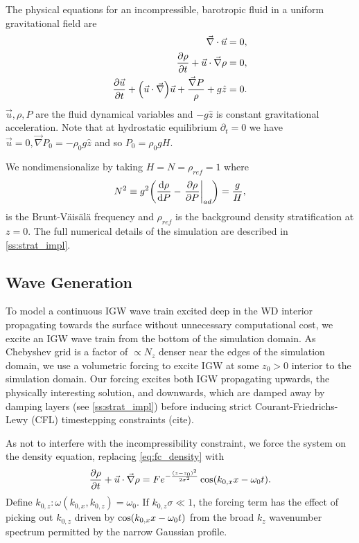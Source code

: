 \documentclass[twocolumn,
        usenames, %
        dvipsnames %
    ]{revtex4-1}%
\newcommand*{\rd}[2]{\frac{\mathrm{d}#1}{\mathrm{d}#2}}
\newcommand*{\pd}[2]{\frac{\partial#1}{\partial#2}}
\newcommand*{\at}[1]{\left.#1\right|}
\DeclarePairedDelimiter\p{\lparen}{\rparen}
\begin{document}
The physical equations for an incompressible, barotropic fluid in a uniform
gravitational field are
\begin{subequations}\label{se:fc_orig}
    \begin{align}
        \vec{\nabla} \cdot \vec{u} &= 0,\\
        \pd{\rho}{t} + \vec{u} \cdot \vec{\nabla}\rho &= 0
            ,\label{eq:fc_density}\\
        \pd{\vec{u}}{t} + \p*{\vec{u} \cdot \vec{\nabla}}\vec{u}
            + \frac{\vec{\nabla}P}{\rho}
            + g\hat{z} &= 0.
    \end{align}
\end{subequations}
$\vec{u}, \rho, P$ are the fluid dynamical variables and $-g\hat{z}$ is constant
gravitational acceleration. Note that at hydrostatic equilibrium $\partial_t =
0$ we have $\vec{u} = 0, \vec{\nabla}P_0 = -\rho_0 g\hat{z}$ and so $P_0 =
\rho_0 gH$.

We nondimensionalize by taking $H = N = \rho_{ref} = 1$ where
\begin{equation}
    N^2 \equiv g^2\p*{\rd{\rho}{P} - \at{\pd{\rho}{P}}_{ad}}
        = \frac{g}{H},
\end{equation}
is the Brunt-V\"ais\"al\"a frequency and $\rho_{ref}$ is the background density
stratification at $z = 0$. The full numerical details of the simulation are
described in \autoref{ss:strat_impl}.

\subsection{Wave Generation}

To model a continuous IGW wave train excited deep in the WD interior propagating
towards the surface without unnecessary computational cost, we excite an
IGW wave train from the bottom of the simulation domain. As Chebyshev grid is
a factor of $\propto N_z$ denser near the edges of the simulation domain, we
use a volumetric forcing to excite IGW at some $z_0 > 0$ interior to the
simulation domain. Our forcing excites both IGW propagating upwards, the
physically interesting solution, and downwards, which are damped away by damping
layers (see \autoref{ss:strat_impl}) before inducing strict Courant-Friedrichs-Lewy
(CFL) timestepping constraints (cite).

As not to interfere with the incompressibility constraint, we force the system
on the density equation, replacing \autoref{eq:fc_density} with
\begin{equation}
    \pd{\rho}{t} + \vec{u} \cdot \vec{\nabla}\rho =
        Fe^{-\frac{(z - z_0)^2}{2\sigma^2}}
            \cos \p*{k_{0, x}x - \omega_0 t}.
\end{equation}
Define $k_{0, z}: \omega(k_{0, x}, k_{0, z}) = \omega_0$. If $k_{0, z}\sigma \ll
1$, the forcing term has the effect of picking out $k_{0, z}$ driven by
$\cos\p*{k_{0, x}x - \omega_0 t}$ from the broad $k_z$ wavenumber spectrum
permitted by the narrow Gaussian profile.
\end{document}
